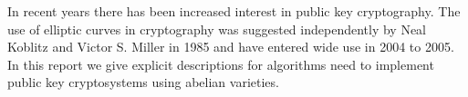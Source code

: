 
In recent years there has been increased interest in public key cryptography. The use of elliptic curves in cryptography was suggested independently by {\color{red} Neal Koblitz and Victor S. Miller in 1985 and have entered wide use in 2004 to 2005}.  In this report we give explicit descriptions for algorithms need to implement public key cryptosystems using abelian varieties. 